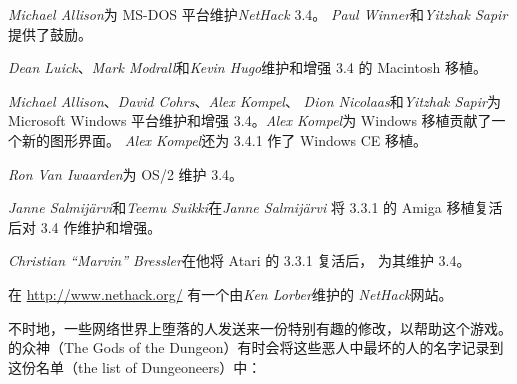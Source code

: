 \documentclass[a4paper, 10pt]{article}
\newcommand{\nd}{\noindent}
\begin{document}
\medskip
{\it Michael Allison}为 MS-DOS 平台维护{\it NetHack\/} 3.4。
{\it Paul Winner}和{\it Yitzhak Sapir}提供了鼓励。

\medskip
{\it Dean Luick}、{\it Mark Modrall}和{\it Kevin Hugo}维护和增强
3.4 的 Macintosh 移植。

\medskip
{\it Michael Allison}、{\it David Cohrs}、{\it Alex Kompel}、
{\it Dion Nicolaas}和{\it Yitzhak Sapir}为 Microsoft Windows 平台维护和增强
3.4。{\it Alex Kompel}为 Windows 移植贡献了一个新的图形界面。
{\it Alex Kompel}还为 3.4.1 作了 Windows CE 移植。

\medskip
{\it Ron Van Iwaarden}为 OS/2 维护 3.4。

\medskip
{\it Janne Salmij\"{a}rvi}和{\it Teemu Suikki}在{\it Janne Salmij\"{a}rvi}
将 3.3.1 的 Amiga 移植复活后对 3.4 作维护和增强。

\medskip
{\it Christian ``Marvin'' Bressler}在他将 Atari 的 3.3.1 复活后，
为其维护 3.4。

\medskip
在 \url{http://www.nethack.org/} 有一个由{\it Ken Lorber}维护的
{\it NetHack}网站。

\bigskip
不时地，一些网络世界上堕落的人发送来一份特别有趣的修改，以帮助这个游戏。
\zhTransDungeon{}的众神（The Gods of the Dungeon）有时会将这些恶人中最坏的人的名字记录到
这份\zhTransDungeoneer{}名单（the list of Dungeoneers）中：
\end{document}
